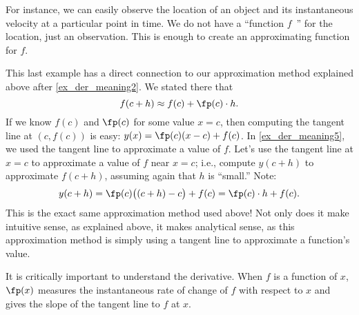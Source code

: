 For instance, we can easily observe the location of an object and its instantaneous velocity at a particular point in time. We do not have a ``function $f$\ '' for the location, just an observation. This is enough to create an approximating function for $f$.

This last example has a direct connection to our approximation method explained above after \autoref{ex_der_meaning2}. We stated there that
\[f(c+h) \approx f(c)+\fp(c)\cdot h.\]
If we know $f(c)$ and $\fp(c)$ for some value $x=c$, then computing the tangent line at $(c,f(c))$ is easy: $y(x) = \fp(c)(x-c)+f(c)$. In \autoref{ex_der_meaning5}, we used the tangent line to approximate a value of $f$. Let's use the tangent line at $x=c$ to approximate a value of $f$ near $x=c$; i.e., compute $y(c+h)$ to approximate $f(c+h)$, assuming again that $h$ is ``small.'' Note:
\[y(c+h) = \fp(c)\bigl((c+h)-c\bigr)+f(c) = \fp(c)\cdot h + f(c).\]
This is the exact same approximation method used above! Not only does it make intuitive sense, as explained above, it makes analytical sense, as this approximation method is simply using a tangent line to approximate a function's value.\bigskip\bigskip


It is critically important to understand the derivative.
When $f$ is a function of $x$, $\fp(x)$ measures the instantaneous rate of change of $f$ with respect to $x$ and gives the slope of the tangent line to $f$ at $x$.


